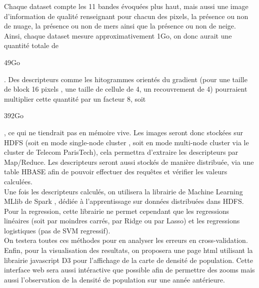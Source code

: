 \documentclass{book}
\begin{document}
Chaque dataset compte les 11 bandes évoquées plus haut, mais aussi une image d'information de 
qualité renseignant pour chacun des pixels, la présence ou non de nuage, la présence ou non de mers ainsi que la 
présence ou non de neige.\\
Ainsi, chaque dataset mesure approximativement 1Go, on donc aurait une quantité totale de \begin{bf}49Go\end{bf} . 
Des descripteurs comme les 
hitogrammes orientés du gradient (pour une taille de block 16 pixels , une taille de cellule de 4, un recouvrement de 4)
pourraient multiplier cette quantité par un facteur 8, soit \begin{bf}392Go\end{bf}, ce qui ne tiendrait pas 
en mémoire vive.
Les images seront donc stockées sur HDFS \cite{White:2009:HDG:1717298} (soit en mode \og single-node cluster \fg, 
soit en mode \og multi-node cluster \fg via le cluster de Telecom ParisTech), cela permettra
d'extraire les descripteurs par Map/Reduce. Les descripteurs seront aussi stockés de manière distribuée, via une table HBASE afin de 
pouvoir effectuer des requ\^{e}tes et vérifier les valeurs calculées.\\
Une fois les descripteurs calculés, on utilisera la librairie de Machine Learning MLlib de Spark \cite{Meng:2016:MML:2946645.2946679}, 
dédiée à l'apprentissage sur données distribuées dans HDFS.
Pour la regression, cette librairie ne permet cependant que les regressions linéaires 
(soit par moindres carrés, par Ridge ou par Lasso) et les regressions logistiques (pas de SVM regressif).\\
On testera toutes ces méthodes pour en analyser les erreurs en cross-validation.\\
Enfin, pour la visualisation des resultats, on proposera une page html utilisant la librairie javascript 
D3 \cite{Jain:2014:DVD:2667432.2667451} pour l'affichage de la carte de densité de population. Cette interface web sera aussi
intéractive que possible afin de permettre des zooms mais aussi l'observation de la densité de population sur une année antérieure.

\clearpage

\backmatter

\listoftables

\listoffigures



\end{document}
